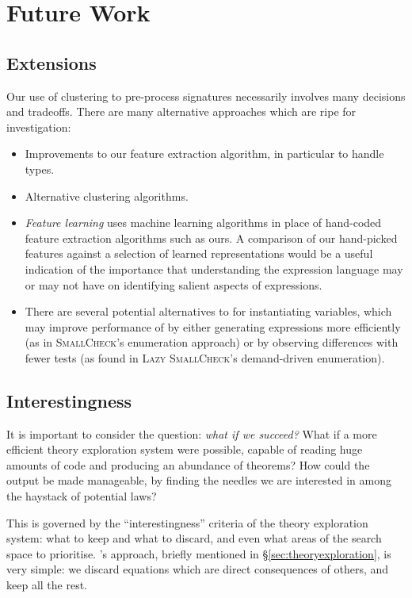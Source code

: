 \section{Future Work}
\label{sec:future}

\subsection{Extensions}
\label{sec:preprocessing}

Our use of clustering to pre-process \qspec{} signatures necessarily involves many decisions and tradeoffs. There are many alternative approaches which are ripe for investigation:

\begin{itemize}
  \item Improvements to our feature extraction algorithm, in particular to handle types.
  \item Alternative clustering algorithms.
  \item \emph{Feature learning} uses machine learning algorithms in place of hand-coded feature extraction algorithms such as ours. A comparison of our hand-picked features against a selection of learned representations would be a useful indication of the importance that understanding the expression language may or may not have on identifying salient aspects of expressions.
  \item There are several potential alternatives to \qcheck{} for instantiating variables, which may improve performance of \qspec{} by either generating expressions more efficiently (as in \textsc{SmallCheck}'s enumeration approach) or by observing differences with fewer tests (as found in \textsc{Lazy SmallCheck}'s demand-driven enumeration).
\end{itemize}

\subsection{Interestingness}
\label{sec:interestingness}

It is important to consider the question: \emph{what if we succeed?} What if a more efficient theory exploration system were possible, capable of reading huge amounts of code and producing an abundance of theorems? How could the output be made manageable, by finding the needles we are interested in among the haystack of potential laws?

This is governed by the ``interestingness'' criteria of the theory exploration system: what to keep and what to discard, and even what areas of the search space to prioritise. \qspec{}'s approach, briefly mentioned in \S \ref{sec:theoryexploration}, is very simple: we discard equations which are direct consequences of others, and keep all the rest.

